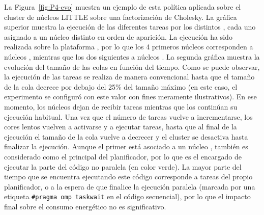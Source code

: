 La Figura~\ref{fig:P4-evo} muestra un ejemplo de esta política aplicada
sobre el cluster de núcleos LITTLE sobre una factorización de Cholesky. La
gráfica superior muestra la ejecución de las diferentes tareas por los
distintos \wts, cada uno asignado a un núcleo distinto en orden de
aparición. La ejecución ha sido realizada sobre la plataforma \juno, por lo
que los 4 primeros núcleos corresponden a núcleos \LITTLE, mientras que los
dos siguientes a núcleos \BIG. La segunda gráfica muestra la evolución del
tamaño de las colas en función del tiempo. Como se puede observar, la
ejecución de las tareas se realiza de manera convencional hasta que el
tamaño de la cola decrece por debajo del 25\% del tamaño máximo (en este
caso, el experimento se configuró con este valor con fines meramente
ilustrativos). En ese momento, los núcleos \LITTLE dejan de recibir tareas
mientras que los \BIG continúan su ejecución habitual. Una vez que el
número de tareas vuelve a incrementarse, los cores lentos vuelven a
activarse y a ejecutar tareas, hasta que al final de la ejecución el tamaño
de la cola vuelve a decrecer y el cluster se desactiva hasta finalizar la
ejecución. Aunque el primer \wt está asociado a un núcleo \LITTLE, también
es considerado como el \wt principal del planificador, por lo que es el
encargado de ejecutar la parte del código no paralela (en color verde). La
mayor parte del tiempo que se encuentra ejecutando este código corresponde
a tareas del propio planificador, o a la espera de que finalice la
ejecución paralela (marcada por una etiqueta \texttt{\#pragma omp taskwait}
en el código secuencial), por lo que el impacto final sobre el consumo
energético no es significativo.

